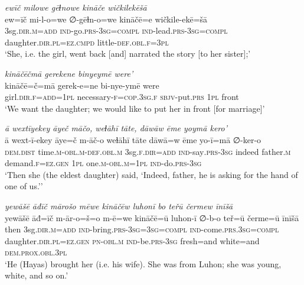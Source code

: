\ea \label{ŽH.46}
\textit{ewīč milowe gēɫnowe kināče wičkilekēšā} \\ 
\gll ew=īč mi-l-o=we ∅-gēɫn-o=we kināčē=e wičkile-ekē=šā \\ 
 3sg\textsc{.dir}\textsc{.m}\textsc{=add} \textsc{ind-}go\textsc{.prs}\textsc{-3sg}\textsc{=compl} \textsc{ind-}lead\textsc{.prs}\textsc{-3sg}\textsc{=compl} daughter\textsc{.dir}\textsc{.pl}\textsc{=ez}\textsc{.cmpd} little\textsc{-def}\textsc{.obl}\textsc{\textsc{.f}}\textsc{=3pl} \\ 
\glt `She, i.e. the girl, went back [and] narrated the story [to her sister];'
\z 
 
\ea \label{ŽH.56}
\textit{kināčēčmā gerekene binyeymē were’} \\ 
\gll kināčē=č=mā gerek-e=ne bi-nye-ymē were \\ 
 girl\textsc{.dir}\textsc{\textsc{.f}}\textsc{=add}\textsc{=1pl} necessary\textsc{-f}\textsc{=cop}\textsc{.3sg}\textsc{\textsc{.f}} \textsc{sbjv-}put\textsc{.prs} \textsc{1pl} front \\ 
\glt `We want the daughter; we would like to put her in front [for marriage]'
\z 
 
\ea \label{ŽH.57}
\textit{ā wextīyekey āyeč māčo, weɫāhī tāte, dāwāw ēme yoymā kero’} \\ 
\gll ā wext-ī-ekey āye=č m-āč-o weɫāhī tāte dāwā=w ēme yo-ī=mā ∅-ker-o \\ 
 \textsc{dem.dist} time\textsc{.m}\textsc{-obl}\textsc{.m}\textsc{-def}\textsc{.obl}\textsc{.m} 3sg\textsc{\textsc{.f}}\textsc{.dir}\textsc{=add} \textsc{ind-}say\textsc{.prs}\textsc{-3sg} indeed father\textsc{.m} demand\textsc{\textsc{.f}}\textsc{=ez}\textsc{.gen} \textsc{1pl} one\textsc{.m}\textsc{-obl}\textsc{.m}\textsc{=1pl} \textsc{ind-}do\textsc{.prs}\textsc{-3sg} \\ 
\glt `Then she (the eldest daughter) said, ‘Indeed, father, he is asking for the hand of one of us.’'
\z 
 
\ea \label{ŽH.65}
\textit{yewāšē āđīč mārošo mēwe kināčēw luhonī bo teřū čermew īnīšā} \\ 
\gll yewāšē āđ=īč m-ār-o=š=o m-ē=we kināčē=ū luhon-ī ∅-b-o teř=ū čerme=ū īnīšā \\ 
 then 3sg\textsc{.dir}\textsc{.m}\textsc{=add} \textsc{ind-}bring\textsc{.prs}\textsc{-3sg}\textsc{=3sg}\textsc{=compl} \textsc{ind-}come\textsc{.prs}\textsc{.3sg}\textsc{=compl} daughter\textsc{.dir}\textsc{.pl}\textsc{=ez}\textsc{.gen} \textsc{pn}\textsc{-obl}\textsc{.m} \textsc{ind-}be\textsc{.prs}\textsc{-3sg} fresh=and white=and \textsc{dem.prox}\textsc{.obl}\textsc{.3pl} \\ 
\glt `He (Hayas) brought her (i.e. his wife). She was from Luhon; she was young, white, and so on.'
\z 
 
